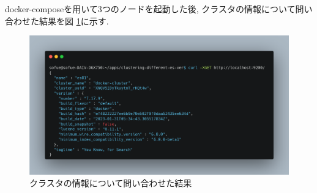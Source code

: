 



docker-composeを用いて3つのノードを起動した後, クラスタの情報について問い合わせた結果を図 \ref{p2-1}に示す.

\begin{figure}[!ht]
  \begin{center}
    \includegraphics[width=160mm]{sotu/figure/3nodes-cluster.png}
    \caption{クラスタの情報について問い合わせた結果}
    \label{p2-1}
  \end{center}
\end{figure}

